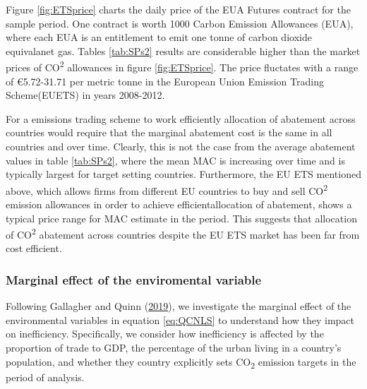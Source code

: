 \documentclass[
  12pt,
]{article}
\begin{document}
Figure \ref{fig:ETSprice} charts the daily price of the EUA Futures contract for the sample period. One contract is worth 1000 Carbon Emission Allowances (EUA), where each EUA is an entitlement to emit one tonne of carbon dioxide equivalanet gas. Tables \ref{tab:SPs2} results are considerable higher than the market prices of CO\textsuperscript{2} allowances in figure \ref{fig:ETSprice}. The price fluctates with a range of €5.72-31.71 per metric tonne in the European Union Emission Trading Scheme(EUETS) in years 2008-2012.

For a emissions trading scheme to work efficiently allocation of abatement across countries would require that the marginal abatement cost is the same in all countries and over time. Clearly, this is not the case from the average abatement values in table \ref{tab:SPs2}, where the mean MAC is increasing over time and is typically largest for target setting countries. Furthermore, the EU ETS mentioned above, which allows firms from different EU countries to buy and sell CO\textsuperscript{2} emission allowances in order to achieve efficientallocation of abatement, shows a typical price range for MAC estimate in the period. This suggests that allocation of CO\textsuperscript{2} abatement across countries despite the EU ETS market has been far from cost efficient.

\hypertarget{marginal-effect-of-the-enviromental-variable}{%
\subsubsection{Marginal effect of the enviromental variable}\label{marginal-effect-of-the-enviromental-variable}}

Following Gallagher and Quinn (\protect\hyperlink{ref-Gallagher2019}{2019}), we investigate the marginal effect of the environmental variables in equation \eqref{eq:QCNLS} to understand how they impact on inefficiency. Specifically, we consider how inefficiency is affected by the proportion of trade to GDP, the percentage of the urban living in a country's population, and whether they country explicitly sets CO\textsubscript{2} emission targets in the period of analysis.
\end{document}
